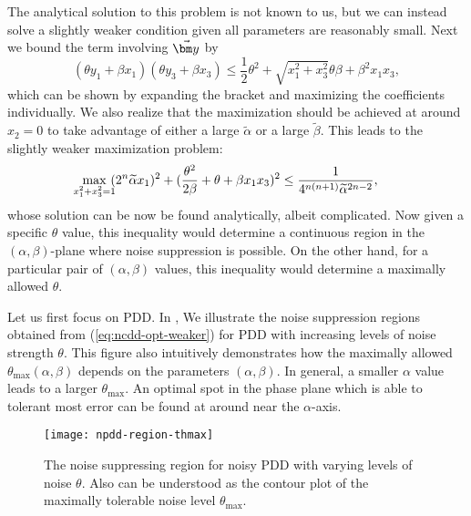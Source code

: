 \documentclass[aps,pra,reprint,superscriptaddress]{revtex4-2}
\newcommand{\alphat}{\widetilde{\alpha}}
\newcommand{\betat}{\widetilde{\beta}}
\begin{document}
The analytical solution to this problem is not known to us, but we can instead solve a slightly weaker condition given all parameters are reasonably small. Next we bound the term involving $\vb y$ by
\begin{equation*}
    (\theta y_1+\beta x_1)(\theta y_3+ \beta x_3) \le \frac{1}{2} \theta^2 
    + \sqrt{x_1^2+x_3^2} \theta\beta + \beta^2 x_1 x_3,  
\end{equation*}
which can be shown by expanding the bracket and maximizing the coefficients individually. We also realize that the maximization should be achieved at around $x_2=0$ to take advantage of either a large $\alphat$ or a large $\betat$. This leads to the slightly weaker maximization problem:
\begin{align}\label{eq:ncdd-opt-weaker}
\max_{\mathclap{x_1^2+x_3^2=1}}\ 
& (2^n\alphat x_1)^2 + (\frac{\theta^2}{2\beta}+\theta +\beta x_1 x_3)^2\le \frac{1}{4^{n(n+1)}\alphat^{2n-2}},
\end{align}
whose solution can be now be found analytically, albeit complicated.
Now given a specific $\theta$ value, this inequality would determine a continuous region in the $(\alpha,\beta)$-plane where noise suppression is possible.  On the other hand, for a particular pair of $(\alpha,\beta)$ values, this inequality would determine a maximally allowed $\theta$.

Let us first focus on PDD.
In ,
We illustrate the noise suppression regions obtained from (\ref{eq:ncdd-opt-weaker}) for PDD with increasing levels of noise strength $\theta$.
This figure also intuitively demonstrates how the maximally allowed $\theta_{\mathrm{max}}(\alpha,\beta)$ depends on the parameters $(\alpha,\beta)$. 
In general, a smaller $\alpha$ value leads to a larger $\theta_{\mathrm{max}}$.  An optimal spot in the phase plane which is able to tolerant most error can be found at around near the $\alpha$-axis. 

\begin{figure}[htbp]
\centering
\texttt{[image: npdd-region-thmax]}
\caption{The noise suppressing region for noisy PDD with varying levels of noise $\theta$. Also can be understood as the contour plot of the maximally tolerable noise level $\theta_{\max}$.}
\label{fig:npdd-reg-tho}
\end{figure}
\end{document}
